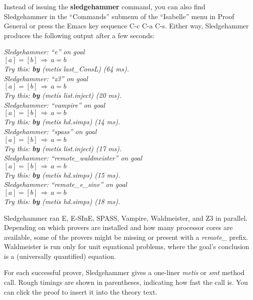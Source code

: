 \documentclass[a4paper,12pt]{article}
\begin{document}
Instead of issuing the \textbf{sledgehammer} command, you can also find
Sledgehammer in the ``Commands'' submenu of the ``Isabelle'' menu in Proof
General or press the Emacs key sequence C-c C-a C-s.
Either way, Sledgehammer produces the following output after a few seconds:

\prew
\slshape
Sledgehammer: ``\textit{e\/}'' on goal \\
$[a] = [b] \,\Longrightarrow\, a = b$ \\
Try this: \textbf{by} (\textit{metis last\_ConsL}) (64 ms). \\[3\smallskipamount]
%
Sledgehammer: ``\textit{z3\/}'' on goal \\
$[a] = [b] \,\Longrightarrow\, a = b$ \\
Try this: \textbf{by} (\textit{metis list.inject}) (20 ms). \\[3\smallskipamount]
%
Sledgehammer: ``\textit{vampire\/}'' on goal \\
$[a] = [b] \,\Longrightarrow\, a = b$ \\
Try this: \textbf{by} (\textit{metis hd.simps}) (14 ms). \\[3\smallskipamount]
%
Sledgehammer: ``\textit{spass\/}'' on goal \\
$[a] = [b] \,\Longrightarrow\, a = b$ \\
Try this: \textbf{by} (\textit{metis list.inject}) (17 ms). \\[3\smallskipamount]
%
Sledgehammer: ``\textit{remote\_waldmeister\/}'' on goal \\
$[a] = [b] \,\Longrightarrow\, a = b$ \\
Try this: \textbf{by} (\textit{metis hd.simps}) (15 ms). \\[3\smallskipamount]
%
Sledgehammer: ``\textit{remote\_e\_sine\/}'' on goal \\
$[a] = [b] \,\Longrightarrow\, a = b$ \\
Try this: \textbf{by} (\textit{metis hd.simps}) (18 ms).
\postw

Sledgehammer ran E, E-SInE, SPASS, Vampire, Waldmeister, and Z3 in parallel.
Depending on which provers are installed and how many processor cores are
available, some of the provers might be missing or present with a
\textit{remote\_} prefix. Waldmeister is run only for unit equational problems,
where the goal's conclusion is a (universally quantified) equation.

For each successful prover, Sledgehammer gives a one-liner \textit{metis} or
\textit{smt} method call. Rough timings are shown in parentheses, indicating how
fast the call is. You can click the proof to insert it into the theory text.
\end{document}
